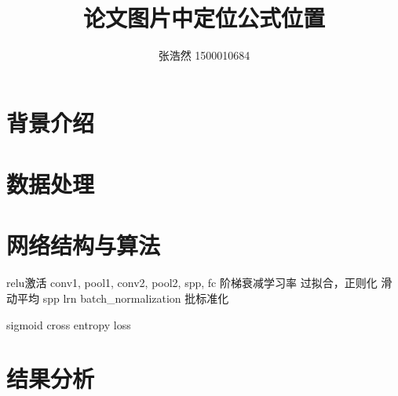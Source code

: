 \documentclass{article}
\title{论文图片中定位公式位置}
\author{张浩然 1500010684}
\date{}
\begin{document}


\maketitle
\tableofcontents

\abstract{}

\newpage

\section{背景介绍}

\section{数据处理}

\section{网络结构与算法}

relu激活
conv1, pool1, conv2, pool2, spp, fc
阶梯衰减学习率
过拟合，正则化
滑动平均
spp
lrn
batch\_normalization 批标准化

sigmoid cross entropy loss


\cite{name1}

\section{结果分析}




\end{document}

